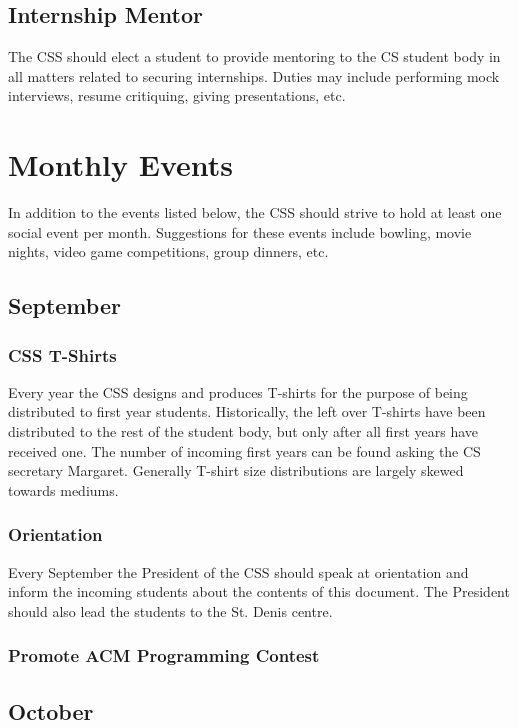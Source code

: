 \documentclass[12pt]{article}
\begin{document}
\subsection{Internship Mentor}
The CSS should elect a student to provide mentoring to the CS student body in
all matters related to securing internships.  Duties may include performing
mock interviews, resume critiquing, giving presentations, etc. 

\section{Monthly Events}
In addition to the events listed below, the CSS should strive to hold at least
one social event per month.  Suggestions for these events include bowling, movie
nights, video game competitions, group dinners, etc.

\subsection{September}

\subsubsection{CSS T-Shirts}
Every year the CSS designs and produces T-shirts for the purpose of being
distributed to first year students.  Historically, the left over T-shirts have
been distributed to the rest of the student body, but only after all first years
have received one.  The number of incoming first years can be found asking
the CS secretary Margaret.  Generally T-shirt size distributions are largely
skewed towards mediums.

\subsubsection{Orientation}
Every September the President of the CSS should speak at orientation and inform
the incoming students about the contents of this document.  The President should
also lead the students to the St. Denis centre.

\subsubsection{Promote ACM Programming Contest}

\subsection{October}
\end{document}
